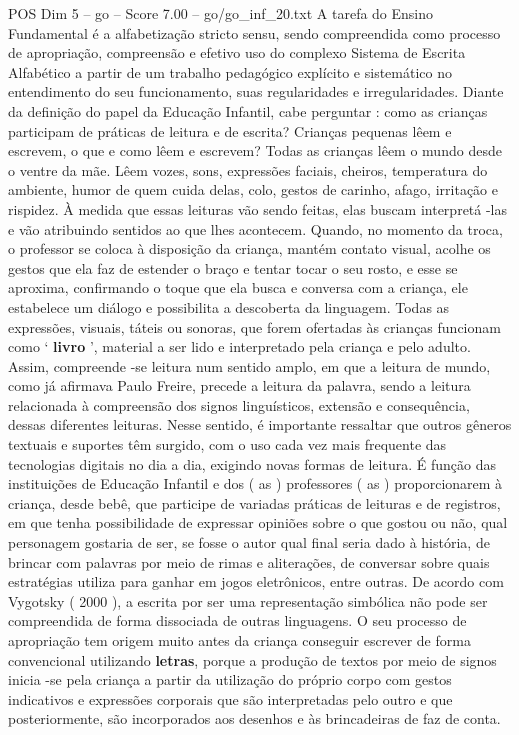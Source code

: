 \begin{textsample}{POS Dim 5 – go – Score 7.00 – go/go\_inf\_20.txt}
A tarefa do Ensino Fundamental é a alfabetização stricto sensu, sendo compreendida como processo de apropriação, compreensão e efetivo uso do complexo Sistema de Escrita Alfabético a partir de um trabalho pedagógico explícito e sistemático no entendimento do seu funcionamento, suas regularidades e irregularidades.
Diante da definição do papel da Educação Infantil, cabe perguntar : como as crianças participam de práticas de leitura e de escrita?
Crianças pequenas lêem e escrevem, o que e como lêem e escrevem?
Todas as crianças lêem o mundo desde o ventre da mãe.
Lêem vozes, sons, expressões faciais, cheiros, temperatura do ambiente, humor de quem cuida delas, colo, gestos de carinho, afago, irritação e rispidez.
À medida que essas leituras vão sendo feitas, elas buscam interpretá -las e vão atribuindo sentidos ao que lhes acontecem.
Quando, no momento da troca, o professor se coloca à disposição da criança, mantém contato visual, acolhe os gestos que ela faz de estender o braço e tentar tocar o seu rosto, e esse se aproxima, confirmando o toque que ela busca e conversa com a criança, ele estabelece um diálogo e possibilita a descoberta da linguagem.
Todas as expressões, visuais, táteis ou sonoras, que forem ofertadas às crianças funcionam como ‘ \textbf{livro} ’, material a ser lido e interpretado pela criança e pelo adulto.
Assim, compreende -se leitura num sentido amplo, em que a leitura de mundo, como já afirmava Paulo Freire, precede a leitura da palavra, sendo a leitura relacionada à compreensão dos signos linguísticos, extensão e consequência, dessas diferentes leituras.
Nesse sentido, é importante ressaltar que outros gêneros textuais e suportes têm surgido, com o uso cada vez mais frequente das tecnologias digitais no dia a dia, exigindo novas formas de leitura.
É função das instituições de Educação Infantil e dos ( as ) professores ( as ) proporcionarem à criança, desde bebê, que participe de variadas práticas de leituras e de registros, em que tenha possibilidade de expressar opiniões sobre o que gostou ou não, qual personagem gostaria de ser, se fosse o autor qual final seria dado à história, de brincar com palavras por meio de rimas e aliterações, de conversar sobre quais estratégias utiliza para ganhar em jogos eletrônicos, entre outras.
De acordo com Vygotsky ( 2000 ), a escrita por ser uma representação simbólica não pode ser compreendida de forma dissociada de outras linguagens.
O seu processo de apropriação tem origem muito antes da criança conseguir escrever de forma convencional utilizando \textbf{letras}, porque a produção de textos por meio de signos inicia -se pela criança a partir da utilização do próprio corpo com gestos indicativos e expressões corporais que são interpretadas pelo outro e que posteriormente, são incorporados aos desenhos e às brincadeiras de faz de conta.

\end{textsample}
